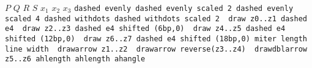 \mpxshipout%
$P$%
\stopmpxshipout
\mpxshipout%
$Q$%
\stopmpxshipout
\mpxshipout%
$R$%
\stopmpxshipout
\mpxshipout%
$S$%
\stopmpxshipout
\mpxshipout%
$x_1$%
\stopmpxshipout
\mpxshipout%
$x_2$%
\stopmpxshipout
\mpxshipout%
$x_3$%
\stopmpxshipout
\mpxshipout%
\tt dashed evenly%
\stopmpxshipout
\mpxshipout%
\tt dashed evenly scaled 2%
\stopmpxshipout
\mpxshipout%
\tt dashed evenly scaled 4%
\stopmpxshipout
\mpxshipout%
\tt dashed withdots%
\stopmpxshipout
\mpxshipout%
\tt dashed withdots scaled 2%
\stopmpxshipout
{} \tt\ draw z0..z1 dashed e4%
\stopmpxshipout
{} \tt\ draw z2..z3 dashed e4 shifted (6bp,0)%
\stopmpxshipout
{} \tt\ draw z4..z5 dashed e4 shifted (12bp,0)%
\stopmpxshipout
{} \tt\ draw z6..z7 dashed e4 shifted (18bp,0)%
\stopmpxshipout
\mpxshipout%
miter length%
\stopmpxshipout
\mpxshipout%
line width%
\stopmpxshipout
{} \tt\ drawarrow z1..z2%
\stopmpxshipout
{} \tt\ drawarrow reverse(z3..z4)%
\stopmpxshipout
{} \tt\ drawdblarrow z5..z6%
\stopmpxshipout
\mpxshipout%
\tt ahlength%
\stopmpxshipout
\mpxshipout%
\tt ahlength%
\stopmpxshipout
\mpxshipout%
\tt ahangle%
\stopmpxshipout

